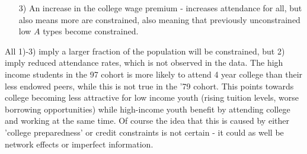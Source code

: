 \documentclass[12pt, a4paper]{article}
\begin{document}
\begin{multicols}{2}
\begin{itemize}
\item[3)] An increase in the college wage premium - increases attendance for all, but also means more are constrained, also meaning that previously unconstrained low $A$ types become constrained.
\end{itemize}
All 1)-3) imply a larger fraction of the population will be constrained, but 2) imply reduced attendance rates, which is not observed in the data. The high income students in the 97 cohort is more likely to attend 4 year college than their less endowed peers, while this is not true in the '79 cohort. This points towards college becoming less attractive for low income youth (rising tuition levels, worse borrowing opportunities) while high-income youth benefit by attending college and working at the same time. Of course the idea that this is caused by either 'college preparedness' or credit constraints is not certain - it could as well be network effects or imperfect information.


\end{multicols}
\end{document}
